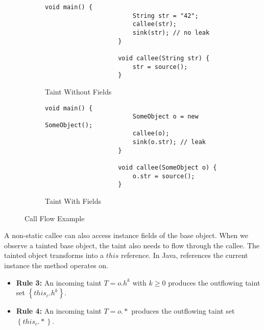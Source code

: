 \documentclass[../draft.tex]{subfiles}
\begin{document}
    \begin{figure}[tbp]
        \centering
        \begin{subfigure}[b]{0.45\textwidth}
            \centering
            \begin{adjustbox}{max width=\columnwidth}
                \begin{lstlisting}[gobble=20]
                    void main() {
                        String str = "42";
                        callee(str);
                        sink(str); // no leak
                    }
            
                    void callee(String str) {
                        str = source();
                    }
                \end{lstlisting}
            \end{adjustbox}
            \caption{Taint Without Fields}
        \end{subfigure}
        \qquad
        \begin{subfigure}[b]{0.45\textwidth}
            \centering
            \begin{adjustbox}{max width=\columnwidth}
                \begin{lstlisting}[gobble=20]
                    void main() {
                        SomeObject o = new SomeObject();
                        callee(o);
                        sink(o.str); // leak
                    }
            
                    void callee(SomeObject o) {
                        o.str = source();
                    }
                \end{lstlisting}
            \end{adjustbox}
            \caption{Taint With Fields}
        \end{subfigure}
        \caption{Call Flow Example}
        \label{lst:primret} 
    \end{figure}

    A non-static callee can also access instance fields of the base object. 
    When we observe a tainted base object, the taint also needs to flow through the callee. 
    The tainted object transforms into a $\mathit{this}$ reference. 
    In Java,  references the current instance the method operates on.
    \begin{itemize}
        \item[] \textbf{Rule 3:} An incoming taint $T=o.h^k$ with $k \geq 0$ produces the outflowing taint set $\left\{\mathit{this}_c.h^k\right\}$. 
        \item[] \textbf{Rule 4:} An incoming taint $T=o.*$ produces the outflowing taint set $\left\{\mathit{this}_c.*\right\}$.
    \end{itemize}
    
\end{document}
